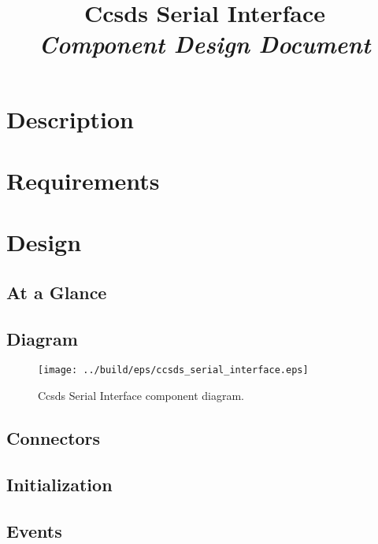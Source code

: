 



\title{\textbf{Ccsds Serial Interface} \\
\large\textit{Component Design Document}}
\date{}
\maketitle

\section{Description}


\section{Requirements}


\section{Design}

\subsection{At a Glance}


\subsection{Diagram}
\begin{figure}[H]
  \texttt{[image: ../build/eps/ccsds\_serial\_interface.eps]}
  \caption{Ccsds Serial Interface component diagram.}
\end{figure}

\subsection{Connectors}


\subsection{Initialization}


\subsection{Events}

